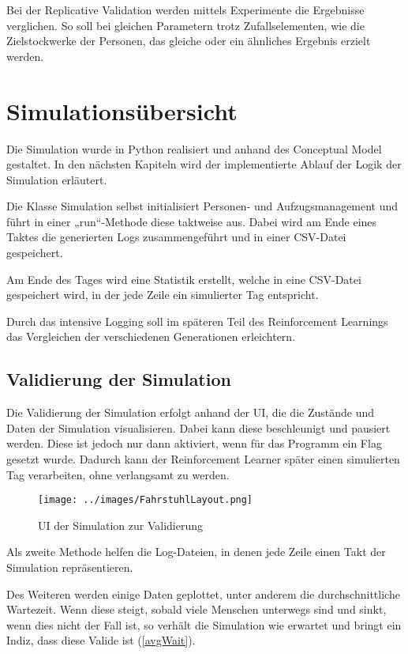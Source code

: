 \documentclass[envcountsame, envcountchap, deutsch]{i-studis}
\begin{document}
Bei der Replicative Validation werden mittels Experimente die Ergebnisse
verglichen. So soll bei gleichen Parametern trotz Zufallselementen, wie
die Zielstockwerke der Personen, das gleiche oder ein ähnliches Ergebnis
erzielt werden.

\hypertarget{simulationsuxfcbersicht}{%
\chapter{Simulationsübersicht}\label{simulationsuxfcbersicht}}

Die Simulation wurde in Python realisiert und anhand des Conceptual
Model gestaltet. In den nächsten Kapiteln wird der implementierte Ablauf
der Logik der Simulation erläutert.

Die Klasse Simulation selbst initialisiert Personen- und
Aufzugsmanagement und führt in einer „run``-Methode diese taktweise aus.
Dabei wird am Ende eines Taktes die generierten Logs zusammengeführt und
in einer CSV-Datei gespeichert.

Am Ende des Tages wird eine Statistik erstellt, welche in eine CSV-Datei
gespeichert wird, in der jede Zeile ein simulierter Tag entspricht.

Durch das intensive Logging soll im späteren Teil des Reinforcement
Learnings das Vergleichen der verschiedenen Generationen erleichtern.

\hypertarget{validierung-der-simulation}{%
\section{Validierung der Simulation}\label{validierung-der-simulation}}

Die Validierung der Simulation erfolgt anhand der UI, die die Zustände
und Daten der Simulation visualisieren. Dabei kann diese beschleunigt
und pausiert werden. Diese ist jedoch nur dann aktiviert, wenn für das
Programm ein Flag gesetzt wurde. Dadurch kann der Reinforcement Learner
später einen simulierten Tag verarbeiten, ohne verlangsamt zu werden.

\begin{figure}
\centering
\texttt{[image: ../images/FahrstuhlLayout.png]}
\caption{UI der Simulation zur Validierung\label{ui}}
\end{figure}

Als zweite Methode helfen die Log-Dateien, in denen jede Zeile einen
Takt der Simulation repräsentieren.

Des Weiteren werden einige Daten geplottet, unter anderem die
durchschnittliche Wartezeit. Wenn diese steigt, sobald viele Menschen
unterwegs sind und sinkt, wenn dies nicht der Fall ist, so verhält die
Simulation wie erwartet und bringt ein Indiz, dass diese Valide ist
(\ref{avgWait}).
\end{document}

